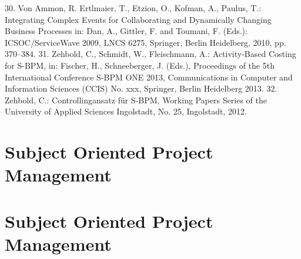 30.	Von Ammon, R. Ertlmaier, T., Etzion, O., Kofman, A., Paulus, T.: Integrating Complex Events for Collaborating and Dynamically Changing Business Processes in: Dan, A., Gittler, F. and Toumani, F. (Eds.): ICSOC/ServiceWave 2009, LNCS 6275, Springer, Berlin Heidelberg, 2010, pp. 370–384.
31.	Zehbold, C., Schmidt, W., Fleischmann, A.: Activity-Based Costing for S-BPM, in: Fischer, H., Schneeberger, J. (Eds.), Proceedings of the 5th International Conference S-BPM ONE 2013, Communications in Computer and Information Sciences (CCIS) No. xxx, Springer, Berlin Heidelberg 2013.
32.	Zehbold, C.: Controllingansatz für S-BPM, Working Papers Series of the University of Applied Sciences Ingolstadt, No. 25, Ingolstadt, 2012.


\section{Subject Oriented Project Management}

\section{Subject Oriented Project Management}

